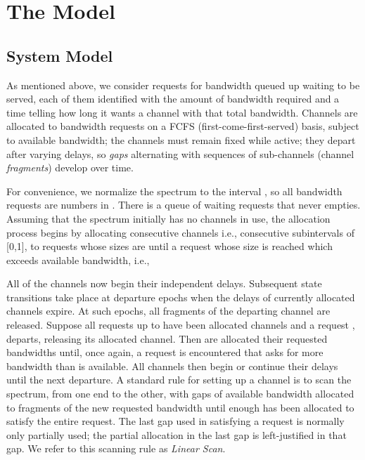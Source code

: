 \documentclass{amsart}
\begin{document}
\section{The Model}\label{sec:model}

\subsection*{System Model}
As  mentioned above, we  consider requests for bandwidth  queued up  waiting to be served, each  of them identified with the amount of  bandwidth required and a  time telling how
long it  wants a channel with that total bandwidth.
Channels are  allocated to bandwidth requests on  a FCFS (first-come-first-served)  basis, subject to
available  bandwidth; the  channels must  remain  fixed while active;  they
depart  after varying  delays,  so \emph{gaps} alternating with sequences of sub-channels (channel \emph{fragments})
develop over time.

For convenience, we  normalize the spectrum to the interval ,  so all bandwidth requests
are numbers in . There is  a  queue of  waiting requests that never empties.  Assuming that the spectrum initially has no channels in use,    the allocation
process    begins   by   allocating   consecutive    channels   i.e.,   consecutive
subintervals of  [0,1], to  requests whose sizes are  until  a request
whose size  is reached which exceeds available bandwidth, i.e.,
 

All  of the channels  now begin their independent delays.  Subsequent  state transitions take  place at departure  epochs when the  delays of
currently allocated channels expire. At such  epochs,
all fragments of the departing channel are released.  Suppose all requests up  to  have been
allocated  channels and  a request  ,  departs, releasing  its allocated
channel.   Then  are  allocated their  requested bandwidths
until, once again, a  request is encountered that asks for more bandwidth than is available.
All channels then begin  or continue their delays
until the next departure. A standard rule for setting up a channel is to
scan the spectrum, from  one end to the other, with gaps  of available bandwidth allocated
to  fragments of  the  new requested  bandwidth until  enough has  been
allocated to  satisfy the entire  request. The  last gap used  in satisfying a  request is
normally only partially used; the partial  allocation in the last gap is left-justified in
that gap. We refer to this scanning rule as {\em  Linear Scan}.
\end{document}
